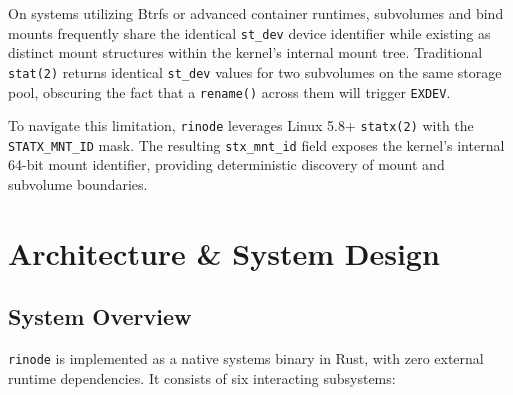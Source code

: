 \documentclass[11pt,a4paper]{article}
\begin{document}
On systems utilizing Btrfs or advanced container runtimes, subvolumes and bind mounts frequently share the identical \texttt{st\_dev} device identifier while existing as distinct mount structures within the kernel's internal mount tree. Traditional \texttt{stat(2)} returns identical \texttt{st\_dev} values for two subvolumes on the same storage pool, obscuring the fact that a \texttt{rename()} across them will trigger \texttt{EXDEV}.

To navigate this limitation, \texttt{rinode} leverages Linux 5.8+ \texttt{statx(2)} with the \texttt{STATX\_MNT\_ID} mask. The resulting \texttt{stx\_mnt\_id} field exposes the kernel's internal 64-bit mount identifier, providing deterministic discovery of mount and subvolume boundaries.

\section{Architecture \& System Design}

\subsection{System Overview}
\texttt{rinode} is implemented as a native systems binary in Rust, with zero external runtime dependencies. It consists of six interacting subsystems:
\end{document}
